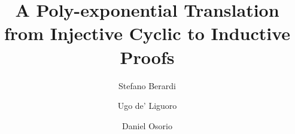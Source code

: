 \documentclass{lmcs}
\begin{document}
\sloppy 
{}


\newcommand{\size} 		                    {{\tt s}}
\newcommand{\state} 		                 {{\tt S}}
\newcommand{\minStable}               {{\tt m}}
\newcommand{\unfold}                     {{\tt u}}
\newcommand{\height}                      {{\tt h}}
\newcommand{\setF} 		                     {{\mathcal F}}
\newcommand{\setU} 	                     {{\mathcal U}}
\newcommand{\cons}                         {{\tt cons}}
\newcommand{\newton} [2]               {{\genfrac(){0pt}{1} {#1}{#2}}}
\newcommand{\MaxInd}                   {{\tt M}}
\newcommand{\Raising}                   {{\tt Raising}}
\newcommand{\trans}                        {{\tt trans}}
\newcommand{\DomCard}                {{\tt DomCard}}
\newcommand{\grouping}                 {{\succeq}}
\newcommand{\cod}                          {{\tt cod}}
\newcommand{\Rel}                          {{\tt Rel}}
\newcommand{\ColRel}                    {{\tt ColRel}}
\newcommand{\InjRel}                      {{\tt InjRel}}
\newcommand{\InjColRel}                {{\tt InjColRel}}
\newcommand{\TypedRel}                {{\tt TypedRel}}
\newcommand{\TypedInjRel}            {{\tt TypedInjRel}}
\newcommand{\Nodes}                     {{\tt Nodes}}
\newcommand{\PowerSet}                {{\mathcal P}}
\newcommand{\ProofUnfolding}      {{\tt Proof}}
\newcommand{\Graph}                       {{\tt Graph}}

\title{A Poly-exponential Translation from Injective Cyclic to Inductive Proofs}
\date{}

\author[S. Berardi]{Stefano Berardi}
\address{Universit\`{a} di Torino, Torino, Italy}

\author[U. deLiguoro]{Ugo de' Liguoro}
\address{Universit\`{a} di Torino, Torino, Italy}

\author[D. Osorio]{Daniel Osorio}
\address{Universit\`{a} di Torino, Torino, Italy}
  

\end{document}
